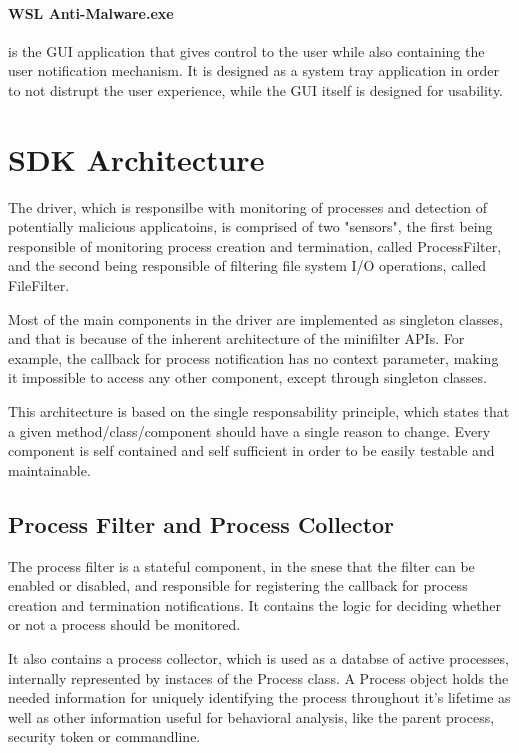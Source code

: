         \paragraph{WSL Anti-Malware.exe}
        is the GUI application that gives control to the user while also containing the user notification mechanism. It is designed as a system
        tray application in order to not distrupt the user experience, while the GUI itself is designed for usability.

    \section{SDK Architecture}
        The driver, which is responsilbe with monitoring of processes and detection of potentially malicious applicatoins, is comprised of
        two "sensors", the first being responsible of monitoring process creation and termination, called ProcessFilter, and the second being
        responsible of filtering file system I/O operations, called FileFilter.

        Most of the main components in the driver are implemented as singleton classes, and that is because of the inherent architecture of
        the minifilter APIs. For example, the callback for process notification has no context parameter, making it impossible to access
        any other component, except through singleton classes.

        This architecture is based on the single responsability principle, which states that a given method/class/component should have a
        single reason to change\cite{CleanCode}. Every component is self contained and self sufficient in order to be easily testable and
        maintainable.

        \subsection{Process Filter and Process Collector}
        The process filter is a stateful component, in the snese that the filter can be enabled or disabled, and responsible for registering
        the callback for process creation and termination notifications. It contains the logic for deciding whether or not a process should be
        monitored.

        It also contains a process collector, which is used as a databse of active processes, internally represented by instaces of the Process
        class. A Process object holds the needed information for uniquely identifying the process throughout it's lifetime as well as other
        information useful for behavioral analysis, like the parent process, security token or commandline.

